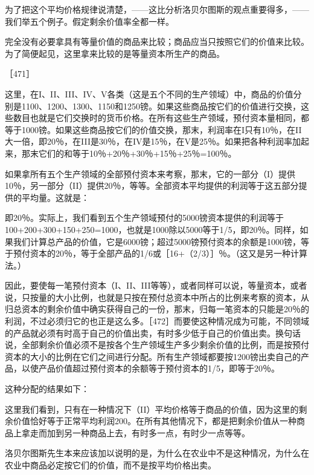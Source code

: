 为了把这个平均价格规律说清楚，——这比分析洛贝尔图斯的观点重要得多，——我们举五个例子。假定剩余价值率全都一样。

完全没有必要拿具有等量价值的商品来比较；商品应当只按照它们的价值来比较。为了简便起见，这里拿来比较的是等量资本所生产的商品。

［471］

这里，在I、II、III、IV、V各类（这是五个不同的生产领域）中，商品的价值分别是1100、1200、1300、1150和1250镑。如果这些商品按它们的价值进行交换，这些数目也就是它们交换时的货币价格。在所有这些生产领域，预付资本量相同，都等于1000镑。如果这些商品按它们的价值交换，那末，利润率在I只有10％，在II大一倍，即20％，在III是30％，在IV是15％，在V是25％。如果把各种利润率加起来，那末它们的和等于10％+20％+30％+15％+25％=100％。

如果拿所有五个生产领域的全部预付资本来考察，那末，它的一部分（I）提供10％，另一部分（II）提供20％，等等。全部资本平均提供的利润等于这五部分提供的平均量。这就是：

\todo{}

即20％。实际上，我们看到五个生产领域预付的5000镑资本提供的利润等于100+200+300+150+250=1000，也就是1000除以5000等于1/5，即20％。同样，如果我们计算总产品的价值，它是6000镑；超过5000镑预付资本的余额是1000镑，等于预付资本的20％，等于全部产品的1/6或［16+（2/3）］％。（这又是另一种计算法。）

因此，要使每一笔预付资本（I、II、III等等），或者同样可以说，等量资本，或者说，只按量的大小比例，也就是只按在预付总资本中所占的比例来考察的资本，从归总资本的剩余价值中确实获得自己的一份，那末，归每一笔资本的只能是20％的利润，不过必须归它的也正是这么多。［472］而要使这种情况成为可能，不同领域的产品就必须有时高于自己的价值出卖，有时多少低于自己的价值出卖。换句话说，全部剩余价值必须不是按各个生产领域生产多少剩余价值的比例，而是按预付资本的大小的比例在它们之间进行分配。所有生产领域都要按1200镑出卖自己的产品，以使产品价值超过预付资本的余额等于预付资本的1/5，即等于20％。

这种分配的结果如下：

这里我们看到，只有在一种情况下（II）平均价格等于商品的价值，因为这里的剩余价值恰好等于正常平均利润200。在所有其他情况下，都是把剩余价值从一种商品上拿走而加到另一种商品上去，有时多一点，有时少一点等等。

洛贝尔图斯先生本来应该加以说明的是，为什么在农业中不是这种情况，为什么在农业中商品必定按它们的价值，而不是按平均价格出卖。

